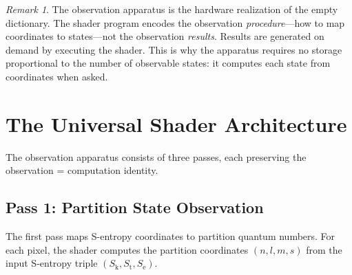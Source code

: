 \documentclass[11pt,twocolumn,a4paper]{article}
\theoremstyle{definition}
\theoremstyle{remark}
\newtheorem{remark}[theorem]{Remark}
\newcommand{\Sk}{S_{\mathrm{k}}}
\newcommand{\St}{S_{\mathrm{t}}}
\newcommand{\Se}{S_{\mathrm{e}}}
\begin{document}
\begin{remark}
The observation apparatus is the hardware realization of the empty dictionary. The shader program encodes the observation \emph{procedure}---how to map coordinates to states---not the observation \emph{results}. Results are generated on demand by executing the shader. This is why the apparatus requires no storage proportional to the number of observable states: it computes each state from coordinates when asked.
\end{remark}


\section{The Universal Shader Architecture}
\label{sec:universal_shader}

The observation apparatus consists of three passes, each preserving the observation = computation identity.

\subsection{Pass 1: Partition State Observation}
\label{sec:pass1}

The first pass maps S-entropy coordinates to partition quantum numbers. For each pixel, the shader computes the partition coordinates $(n, l, m, s)$ from the input S-entropy triple $(\Sk, \St, \Se)$.
\end{document}
